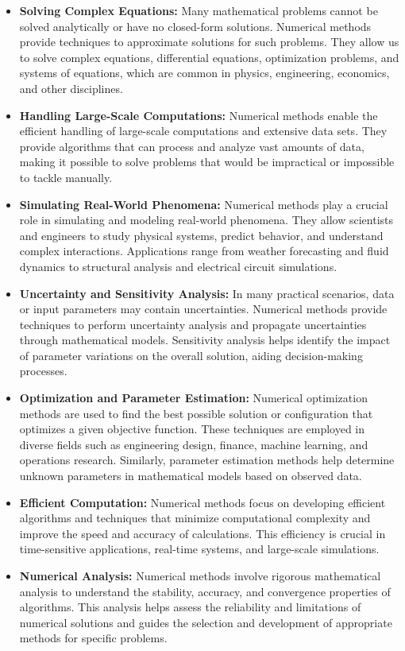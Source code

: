 \begin{itemize}
\item {\bf Solving Complex Equations:} Many mathematical problems cannot be solved analytically or have no closed-form solutions. Numerical methods provide techniques to approximate solutions for such problems. They allow us to solve complex equations, differential equations, optimization problems, and systems of equations, which are common in physics, engineering, economics, and other disciplines.
\item {\bf Handling Large-Scale Computations:} Numerical methods enable the efficient handling of large-scale computations and extensive data sets. They provide algorithms that can process and analyze vast amounts of data, making it possible to solve problems that would be impractical or impossible to tackle manually.
\item {\bf Simulating Real-World Phenomena:} Numerical methods play a crucial role in simulating and modeling real-world phenomena. They allow scientists and engineers to study physical systems, predict behavior, and understand complex interactions. Applications range from weather forecasting and fluid dynamics to structural analysis and electrical circuit simulations.
\item {\bf Uncertainty and Sensitivity Analysis:} In many practical scenarios, data or input parameters may contain uncertainties. Numerical methods provide techniques to perform uncertainty analysis and propagate uncertainties through mathematical models. Sensitivity analysis helps identify the impact of parameter variations on the overall solution, aiding decision-making processes.
\item {\bf Optimization and Parameter Estimation:} Numerical optimization methods are used to find the best possible solution or configuration that optimizes a given objective function. These techniques are employed in diverse fields such as engineering design, finance, machine learning, and operations research. Similarly, parameter estimation methods help determine unknown parameters in mathematical models based on observed data.
\item {\bf Efficient Computation:} Numerical methods focus on developing efficient algorithms and techniques that minimize computational complexity and improve the speed and accuracy of calculations. This efficiency is crucial in time-sensitive applications, real-time systems, and large-scale simulations.
\item {\bf Numerical Analysis:} Numerical methods involve rigorous mathematical analysis to understand the stability, accuracy, and convergence properties of algorithms. This analysis helps assess the reliability and limitations of numerical solutions and guides the selection and development of appropriate methods for specific problems.
\end{itemize}


